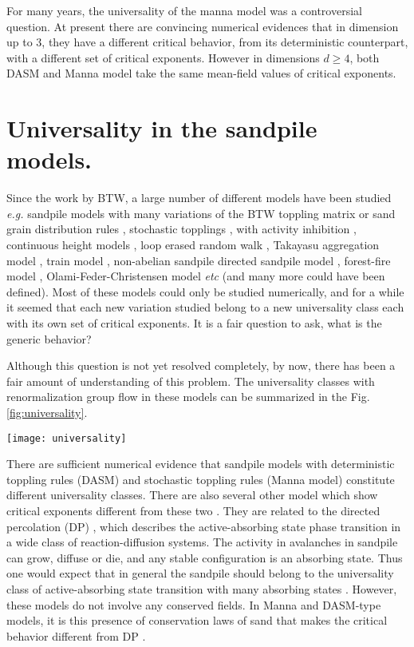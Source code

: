\documentclass[11pt,a4paper]{book}
\begin{document}
For many years, the universality of the manna model was a controversial
question. At present there are convincing numerical evidences that in
dimension up to $3$, they have a different critical behavior, from its
deterministic counterpart, with a different set of critical exponents.
However in dimensions $d\ge 4$, both DASM and Manna model take the same
mean-field values of critical exponents.

\section{Universality in the sandpile models.}
Since the work by BTW, a large number of different models have been
studied \textit{e.g.} sandpile models with many variations of the BTW toppling
matrix \cite{kadanoff} or sand grain distribution rules
\cite{maslov}, stochastic topplings \cite{manna}, with
activity inhibition \cite{manna2}, continuous
height models \cite{zhang}, loop erased random walk \cite{loop},
Takayasu aggregation model \cite{takayasu}, train model
\cite{train1,train2}, non-abelian sandpile directed sandpile model
\cite{lee,pan,threshold,pruessner}, forest-fire model \cite{forest},
Olami-Feder-Christensen model \cite{ofc} \textit{etc} (and many more could
have been defined). Most of these models could only be studied numerically,
and for a while it seemed that each new variation studied belong to a
new universality class each with its own set of critical exponents. It is a fair
question to ask, what is the generic behavior?

Although this question is not yet resolved
completely, by now, there has been a fair amount of understanding of
this problem. The universality classes with renormalization group flow
in these models can be summarized in the Fig. \ref{fig:universality}.
\begin{SCfigure}
\texttt{[image: universality]}
\caption{ A schematic flow diagram of renormalization
group flows between different fixed points of sandpile models.}
\label{fig:universality}
\end{SCfigure}

There are sufficient numerical evidence that sandpile models with
deterministic toppling rules (DASM) and stochastic toppling rules
(Manna model)
constitute different universality classes. There are also several
other model which show critical exponents different from these two
\cite{sneppen1,sneppen2,grass}.
They are related to the directed
percolation (DP) \cite{dp}, which describes the
active-absorbing state phase transition in a wide class of
reaction-diffusion systems. The activity in avalanches in sandpile
can grow, diffuse or die, and any stable configuration is an absorbing
state. Thus one would expect that in general the sandpile should belong to the
universality class of active-absorbing state transition with many
absorbing states \cite{path}. However, these models do not involve any conserved
fields. In Manna and DASM-type models, it is this presence of conservation laws of sand that makes the
critical behavior different from DP \cite{vespignani}.
\end{document}
